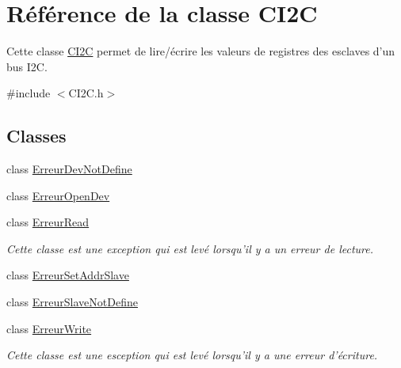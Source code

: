 \hypertarget{class_c_i2_c}{\section{Référence de la classe C\+I2\+C}
\label{class_c_i2_c}
}


Cette classe \hyperlink{class_c_i2_c}{C\+I2\+C} permet de lire/écrire les valeurs de registres des esclaves d'un bus I2\+C.  




{\ttfamily \#include $<$C\+I2\+C.\+h$>$}

\subsection*{Classes}
\begin{DoxyCompactItemize}
\item 
class \hyperlink{class_c_i2_c_1_1_erreur_dev_not_define}{Erreur\+Dev\+Not\+Define}
\item 
class \hyperlink{class_c_i2_c_1_1_erreur_open_dev}{Erreur\+Open\+Dev}
\item 
class \hyperlink{class_c_i2_c_1_1_erreur_read}{Erreur\+Read}
\begin{DoxyCompactList}\small\item\em Cette classe est une exception qui est levé lorsqu'il y a un erreur de lecture. \end{DoxyCompactList}\item 
class \hyperlink{class_c_i2_c_1_1_erreur_set_addr_slave}{Erreur\+Set\+Addr\+Slave}
\item 
class \hyperlink{class_c_i2_c_1_1_erreur_slave_not_define}{Erreur\+Slave\+Not\+Define}
\item 
class \hyperlink{class_c_i2_c_1_1_erreur_write}{Erreur\+Write}
\begin{DoxyCompactList}\small\item\em Cette classe est une esception qui est levé lorsqu'il y a une erreur d'écriture. \end{DoxyCompactList}\end{DoxyCompactItemize}
